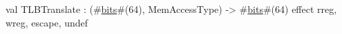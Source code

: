 val TLBTranslate : (#\hyperref[zbits]{bits}#(64), MemAccessType) -> #\hyperref[zbits]{bits}#(64) effect {rreg, wreg, escape, undef}
